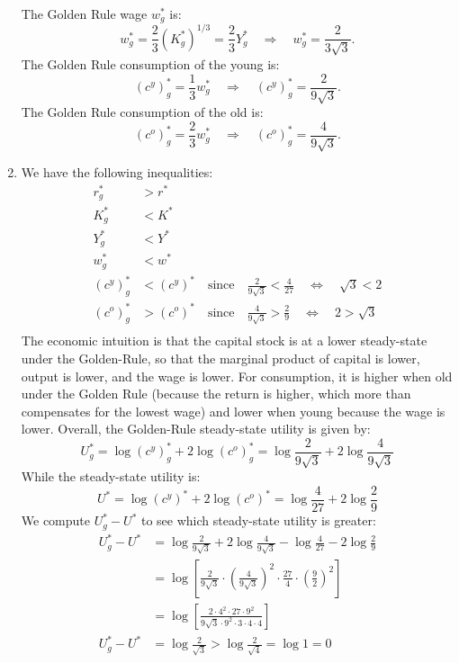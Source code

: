 \documentclass[]{book}
\theoremstyle{definition}
\theoremstyle{definition}
\theoremstyle{definition}
\theoremstyle{remark}
\begin{document}
\begin{enumerate}
  The Golden Rule wage \(w^{*}_g\) is:
  \[w^{*}_g=\frac{2}{3}(K^{*}_g)^{1/3}=\frac{2}{3}Y^{*}_g \quad \Rightarrow \quad \boxed{w^{*}_g = \frac{2}{3\sqrt{3}}}.\]
  The Golden Rule consumption of the young is:
  \[(c^y)^{*}_g = \frac{1}{3}w^{*}_g \quad \Rightarrow \quad \boxed{(c^y)^{*}_g = \frac{2}{9\sqrt{3}}}.\]
  The Golden Rule consumption of the old is:
  \[(c^o)^{*}_g = \frac{2}{3}w^{*}_g \quad \Rightarrow \quad \boxed{(c^o)^{*}_g = \frac{4}{9\sqrt{3}}}.\]
\item
  We have the following inequalities: \[
  \begin{aligned}
  r^{*}_g &> r^{*}\\
  K^{*}_g &< K^{*}\\
  Y^{*}_g &< Y^{*}\\
  w^{*}_g &< w^{*}\\
  (c^y)^{*}_g &< (c^y)^{*} \quad \text{since} \quad \frac{2}{9\sqrt{3}}<\frac{4}{27} \quad \Leftrightarrow \quad \sqrt{3} <2 \\
  (c^o)^{*}_g &> (c^o)^{*} \quad \text{since} \quad \frac{4}{9\sqrt{3}}>\frac{2}{9} \quad \Leftrightarrow \quad 2 >\sqrt{3} \\
  \end{aligned}
  \] The economic intuition is that the capital stock is at a lower
  steady-state under the Golden-Rule, so that the marginal product of
  capital is lower, output is lower, and the wage is lower. For
  consumption, it is higher when old under the Golden Rule (because the
  return is higher, which more than compensates for the lowest wage) and
  lower when young because the wage is lower. Overall, the Golden-Rule
  steady-state utility is given by:
  \[U^*_g = \log(c^y)^{*}_g+2\log(c^o)^{*}_g = \log\frac{2}{9\sqrt{3}}+2\log \frac{4}{9\sqrt{3}}\]
  While the steady-state utility is:
  \[U^* = \log(c^y)^{*}+2\log(c^o)^{*} = \log\frac{4}{27}+2\log \frac{2}{9}\]
  We compute \(U^{*}_g-U^{*}\) to see which steady-state utility is
  greater: \[
  \begin{aligned}
  U^{*}_g-U^{*} &= \log\frac{2}{9\sqrt{3}}+2\log \frac{4}{9\sqrt{3}} - \log\frac{4}{27}-2\log \frac{2}{9}\\
  &= \log \left[\frac{2}{9\sqrt{3}} \cdot \left(\frac{4}{9\sqrt{3}}\right)^2 \cdot\frac{27}{4} \cdot \left(\frac{9}{2}\right)^2\right]\\
  &=\log \left[\frac{2 \cdot 4^2 \cdot 27 \cdot 9^2}{9\sqrt{3} \cdot 9^2 \cdot 3\cdot 4 \cdot 4}\right]\\
  U^{*}_g-U^{*}&=\log \frac{2}{\sqrt3} > \log \frac{2}{\sqrt4}=\log1 =0
  \end{aligned}
\]
\end{enumerate}
\end{document}
